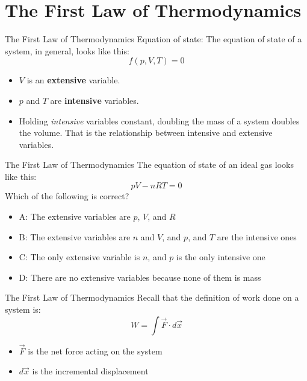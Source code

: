 \documentclass{beamer}
\begin{document}
\section{The First Law of Thermodynamics}

\begin{frame}{The First Law of Thermodynamics}
\alert{Equation of state}: The equation of state of a system, in general, looks like this:
\begin{equation}
f(p,V,T) = 0
\end{equation}
\begin{itemize}
\item $V$ is an \textbf{extensive} variable.
\item $p$ and $T$ are \textbf{intensive} variables.
\item Holding \textit{intensive} variables constant, doubling the mass of a system doubles the volume.  That is the relationship between intensive and extensive variables.
\end{itemize}
\end{frame}

\begin{frame}{The First Law of Thermodynamics}
\alert{The equation of state of an ideal gas} looks like this:
\begin{equation}
pV - nRT = 0
\end{equation}
Which of the following is correct?
\begin{itemize}
\item A: The extensive variables are $p$, $V$, and $R$
\item B: The extensive variables are $n$ and $V$, and $p$, and $T$ are the intensive ones
\item C: The only extensive variable is $n$, and $p$ is the only intensive one
\item D: There are no extensive variables because none of them is mass
\end{itemize}
\end{frame}

\begin{frame}{The First Law of Thermodynamics}
Recall that the definition of work done on a system is:
\begin{equation}
W = \int \vec{F} \cdot d\vec{x}
\label{eq:work}
\end{equation}
\begin{itemize}
\item $\vec{F}$ is the net force acting on the system
\item $d\vec{x}$ is the incremental displacement
\end{itemize}
\end{frame}
\end{document}
